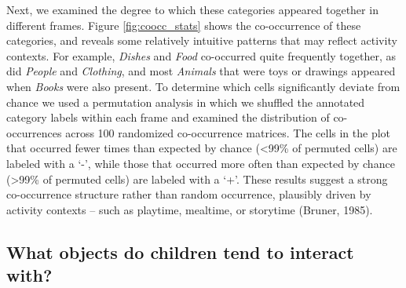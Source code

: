 \documentclass[10pt, letterpaper]{article}
\begin{document}
Next, we examined the degree to which these categories appeared together
in different frames. Figure \ref{fig:coocc_stats} shows the
co-occurrence of these categories, and reveals some relatively intuitive
patterns that may reflect activity contexts. For example, \emph{Dishes}
and \emph{Food} co-occurred quite frequently together, as did
\emph{People} and \emph{Clothing}, and most \emph{Animals} that were
toys or drawings appeared when \emph{Books} were also present. To
determine which cells significantly deviate from chance we used a
permutation analysis in which we shuffled the annotated category labels
within each frame and examined the distribution of co-occurrences across
100 randomized co-occurrence matrices. The cells in the plot that
occurred fewer times than expected by chance (\textless99\% of permuted
cells) are labeled with a `-', while those that occurred more often than
expected by chance (\textgreater99\% of permuted cells) are labeled with
a `+'. These results suggest a strong co-occurrence structure rather
than random occurrence, plausibly driven by activity contexts -- such as
playtime, mealtime, or storytime (Bruner, 1985).

\hypertarget{what-objects-do-children-tend-to-interact-with}{%
\subsection{What objects do children tend to interact
with?}\label{what-objects-do-children-tend-to-interact-with}}
\end{document}
